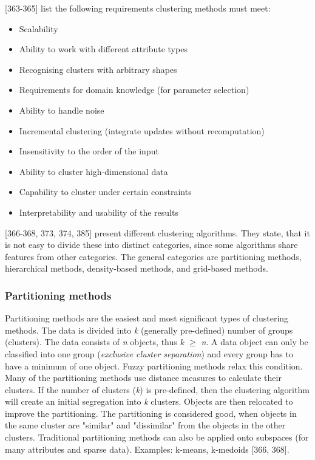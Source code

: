 \textcite{han2011data}[363-365] list the following requirements  clustering methods must meet:
\begin{itemize}
  \item Scalability
  \item Ability to work with different attribute types
  \item Recognising clusters with arbitrary shapes
  \item Requirements for domain knowledge (for parameter selection)
  \item Ability to handle noise
  \item Incremental clustering (integrate updates without recomputation)
  \item Insensitivity to the order of the input
  \item Ability to cluster high-dimensional data 
  \item Capability to cluster under certain constraints
  \item Interpretability and usability of the results
\end{itemize}


\textcite{han2011data}[366-368, 373, 374, 385] present different clustering algorithms. They state, that it is not easy to divide these into distinct categories, since some algorithms share features from other categories. The general categories are partitioning methods, hierarchical methods, density-based methods, and grid-based methods.

  \subsubsection{Partitioning methods}
  Partitioning methods are the easiest and most significant types of clustering methods. The data is divided into \textit{k} (generally pre-defined) number of groups (clusters). The data consists of \textit{n} objects, thus \textit{k $\geq$ n}. A data object can only be classified into one group (\textit{exclusive cluster separation}) and every group has to have a minimum of one object. Fuzzy partitioning methods relax this condition.
  Many of the partitioning methods use distance measures to calculate their clusters. If the number of clusters (\textit{k}) is pre-defined, then the clustering algorithm will create an initial segregation into \textit{k} clusters. Objects are then relocated to improve the partitioning. The partitioning is considered good, when objects in the same cluster are "similar" and "dissimilar" from the objects in the other clusters. Traditional partitioning methods can also be applied onto subspaces (for many attributes and sparse data).  Examples: k-means, k-medoids \autocite{han2011data}[366, 368].
  

